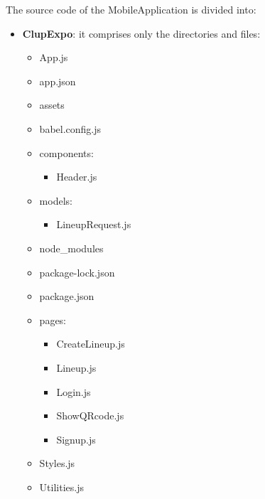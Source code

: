 The source code of the MobileApplication is divided into: 
\begin{itemize}
\item \textbf{ClupExpo}: it comprises only the directories and files: \\
		\begin{itemize}
			\item App.js
			\item app.json
			\item assets
			\item babel.config.js
			\item components: 
						\begin{itemize}
							\item Header.js
						\end{itemize}
			\item models: 
						\begin{itemize}
							\item LineupRequest.js
						\end{itemize}
			\item node\_modules
			\item package-lock.json
			\item package.json
			\item pages: 
						\begin{itemize}
							\item CreateLineup.js
							\item Lineup.js
							\item Login.js
							\item ShowQRcode.js
							\item Signup.js
						\end{itemize}
			\item Styles.js
			\item Utilities.js		
		\end{itemize}
\end{itemize}


 